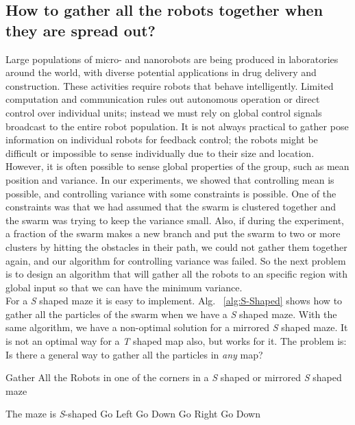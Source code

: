 \subsection{How to gather all the robots together when they are spread out?}
Large populations of micro- and nanorobots are being produced in laboratories around the world, with diverse potential applications in drug delivery and construction. These activities require robots that behave intelligently. Limited computation and communication rules out autonomous operation or direct control over individual units; instead we must rely on global control signals broadcast to the entire robot population. It is not always practical to gather pose information on individual robots for feedback control; the robots might be difficult or impossible to sense individually due to their size and location. 
However, it is often possible to sense global properties of the group, such as mean position and variance. In our experiments, we showed that controlling mean is possible, and controlling variance with some constraints is possible. One of the constraints was that we had assumed that the swarm is clustered together and the swarm was trying to keep the variance small. Also, if during the experiment, a fraction of the swarm makes a new branch and put the swarm to two or more clusters by hitting the obstacles in their path, we could not gather them together again, and our algorithm for controlling variance was failed. So the next problem is to design an algorithm that will gather all the robots to an specific region with global input so that we can have the minimum variance. \\

For a \emph{S} shaped maze it is easy to implement. Alg. ~\ref{alg:S-Shaped} shows how to gather all the particles of the swarm when we have a \emph{S} shaped maze. With the same algorithm, we have a non-optimal solution for a mirrored \emph{S} shaped maze. It is not an optimal way for a \emph{T} shaped map also, but works for it. The problem is: Is there a general way to gather all the particles in \emph{any} map?

\begin{algorithm}
\caption{Gather All the Robots in one of the corners in a \emph{S} shaped or mirrored \emph{S} shaped maze}\label{alg:S-Shaped}
\begin{algorithmic}[1]

\Ensure   The maze is \emph{S}-shaped
\State Go Left
\State Go Down
\State Go Right
\State Go Down
\EndWhile


\end{algorithmic}
\end{algorithm}



